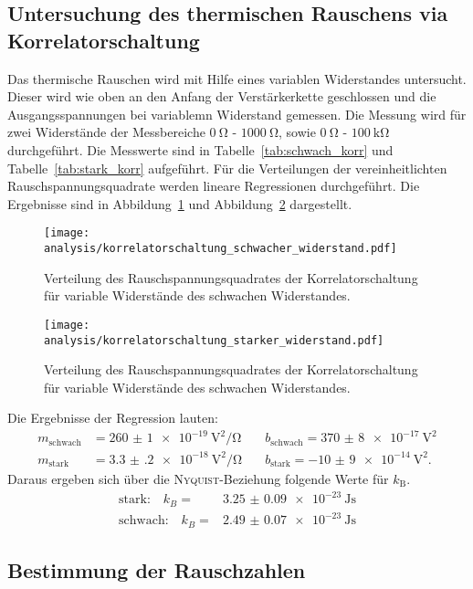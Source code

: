 \subsection{Untersuchung des thermischen Rauschens via Korrelatorschaltung}
%
Das thermische Rauschen wird mit Hilfe eines variablen Widerstandes untersucht. Dieser wird wie oben an den Anfang der Verstärkerkette geschlossen und die Ausgangsspannungen bei variablemn Widerstand gemessen. Die Messung wird für zwei Widerstände der Messbereiche $\SI{0}{\ohm}$ - $\SI{1000}{\ohm}$, sowie $\SI{0}{\ohm}$ - $\SI{100}{\kilo\ohm}$ durchgeführt. Die Messwerte sind in Tabelle~\ref{tab:schwach_korr} und Tabelle~\ref{tab:stark_korr} aufgeführt.
Für die Verteilungen der vereinheitlichten Rauschspannungsquadrate werden lineare Regressionen durchgeführt. Die Ergebnisse sind in Abbildung~\ref{fig:korr_schwach} und Abbildung~\ref{fig:korr_stark} dargestellt.
%
\begin{figure}
  \centering
  \texttt{[image: analysis/korrelatorschaltung\_schwacher\_widerstand.pdf]}
  \caption{Verteilung des Rauschspannungsquadrates der Korrelatorschaltung für variable Widerstände des schwachen Widerstandes.}
  \label{fig:korr_schwach}
\end{figure}
%
\begin{figure}
  \centering
  \texttt{[image: analysis/korrelatorschaltung\_starker\_widerstand.pdf]}
  \caption{Verteilung des Rauschspannungsquadrates der Korrelatorschaltung für variable Widerstände des schwachen Widerstandes.}
  \label{fig:korr_stark}
\end{figure}
%
Die Ergebnisse der Regression lauten:
%
\begin{align*}
  m_\text{schwach}&=\SI{260(1)e-19}{\volt\squared\per\ohm} \quad &b_\text{schwach}=\SI{370(8)e-17}{\volt\squared} \\ m_\text{stark}&=\SI{3.3(2)e-18}{\volt\squared\per\ohm} \quad &b_\text{stark}=\SI{-10(9)e-14}{\volt\squared}.
\end{align*}
%
Daraus ergeben sich über die \textsc{Nyquist}-Beziehung folgende Werte für $k_\text{B}$.
%
\begin{align}
  \text{stark:}\quad k_{B}=&\SI{3.25(9)e-23}{\joule\second} \\
  \text{schwach:}\quad k_{B}=&\SI{2.49(7)e-23}{\joule\second}
\end{align}
%
\subsection{Bestimmung der Rauschzahlen}
